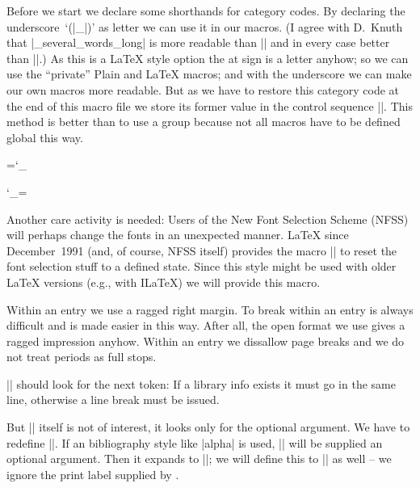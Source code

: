 \sect Before we start we declare some shorthands for category codes.
By declaring the underscore~`(|_|)' as letter we can use it in our
macros. (I agree with {\sc D.~Knuth} that
|\identifier_several_words_long| is more readable than
|\IdentifierSeveralWordsLong| and in every case better than
|\p@@@s|.) As this is a \LaTeX{} style option the at sign is a letter
anyhow; so we can use the ``private'' Plain and \LaTeX{} macros; and
with the underscore we can make our own macros more readable.  But as
we have to restore this category code at the end of this macro file
we store its former value in the control sequence |\uscode|. This
method is better than to use a group because not all macros have to
be defined global this way.

\beginprog
\chardef{}
\chardef{}
\chardef{}
\chardef{}
\chardef{}

\chardef\uscode=\catcode`\_	 %

\catcode`\_=
\endprog


\sect Another care activity is needed: Users of the New Font
Selection Scheme (NFSS) will perhaps change the fonts in an
unexpected manner. \LaTeX{} since December~1991 (and, of course, NFSS
itself) provides the macro |\reset@font| to reset the font selection
stuff to a defined state. Since this style might be used with older
\LaTeX{} versions (e.g., with I\LaTeX{}) we will provide this macro.

\beginprog
\ifx \reset@font\undefined
    \let\reset@font\relax
\fi
\endprog


\sect Within an entry we use a ragged right margin. To break within an
entry is always difficult and is made easier in this way. After all,
the open format we use gives a ragged impression anyhow. Within an
entry we dissallow page breaks and we do not treat periods as full
stops.

\beginprog
\def\thebibliography#1{%
    \description
    	\rightskip \z@ plus 2em
	\interlinepenalty\@M
    	\sfcode`\.=\@m
    }
\let\endthebibliography=\enddescription
\endprog


\sect |\bibitem| should look for the next token: If a library info
exists it must go in the same line, otherwise a line break must be
issued.

But |\bibitem| itself is not of interest, it looks only for the
optional argument. We have to redefine |\@bibitem|. If an
bibliography style like |alpha| is used, |\bibitem| will be supplied
an optional argument. Then it expands to |\@lbibitem|; we will define
this to |\@bibitem| as well -- we ignore the print label supplied by
\BibTeX{}.

